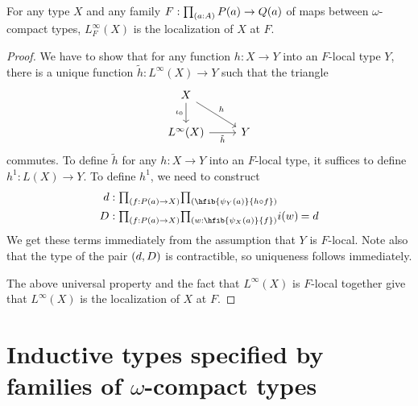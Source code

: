 \begin{thm}
For any type $X$ and any family $F:\prd{a:A}P(a)\to Q(a)$ of maps between
$\omega$-compact types, $L_F^\infty(X)$ is the localization of $X$ at $F$.
\end{thm}

\begin{proof}
We have to show that for any function $h:X\to Y$ into an
$F$-local type $Y$, there is a unique function $\tilde{h}: L^\infty(X)\to
Y$ such that the triangle
\begin{equation*}
\begin{tikzcd}
X \arrow[dr,"h"] \arrow[d,swap,"\iota_0"] \\ 
L^\infty(X) \arrow[r,swap,"\tilde{h}"] & Y
\end{tikzcd}
\end{equation*}
commutes. To define $\tilde{h}$ for any $h:X\to Y$ into an $F$-local type, 
it suffices to define $h^1:L(X)\to Y$. To define $h^1$, we need to construct
\begin{align*}
d & : \prd{f:P(a)\to X} \hfib{\psi_Y(a)}{h\circ f}\\
D & : \prd{f:P(a)\to X}{w:\hfib{\psi_{X}(a)}{f}}\id{i(w)}{d}
\end{align*}
We get these terms immediately from the assumption that $Y$ is $F$-local.
Note also that the type of the pair ${\mathopen{}(d,D)\mathclose{}}$ is contractible, so uniqueness
follows immediately.

The above universal property and the fact that $L^\infty(X)$ is $F$-local
together give that $L^\infty(X)$ is the localization of $X$ at $F$.
\end{proof}

\section{Inductive types specified by families of $\omega$-compact types}
